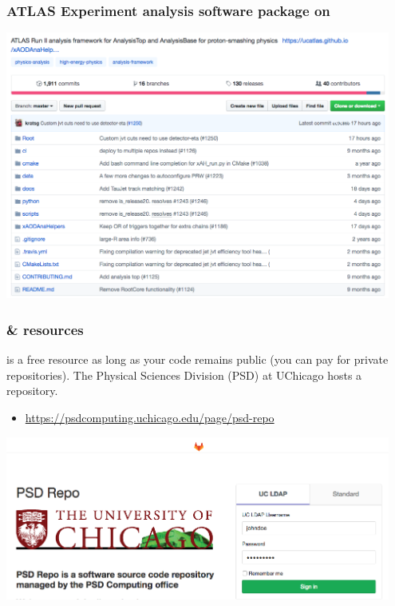 \documentclass[hyperref={colorlinks=true}]{beamer}
\begin{document}
\begin{frame}%
  \frametitle{ATLAS Experiment analysis software package on \github}
  
  \includegraphics[width=0.95\textwidth]{xAODAnaHelpers.png}

\end{frame}


\begin{frame}%
  \frametitle{\github \& \gitlab resources }
  
  \github is a free resource as long as your code remains public (you can pay for private repositories). The Physical Sciences Division (PSD) at UChicago hosts a  \gitlab repository.

  \begin{itemize}
    \item \url{https://psdcomputing.uchicago.edu/page/psd-repo}
  \end{itemize}
  
  \includegraphics[width=0.95\textwidth]{PSDRepo.png}

\end{frame}
\end{document}
